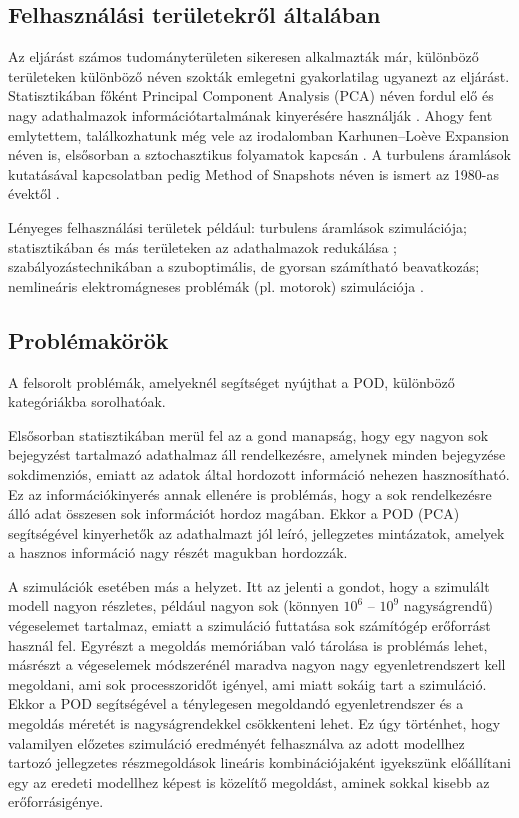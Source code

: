         \subsection{Felhasználási területekről általában}
            Az eljárást számos tudományterületen sikeresen alkalmazták már, különböző területeken különböző néven szokták emlegetni gyakorlatilag ugyanezt az eljárást. Statisztikában főként Principal Component Analysis (PCA) néven fordul elő és nagy adathalmazok információtartalmának kinyerésére használják \cite{Jolliffe16}. Ahogy fent emlytettem, találkozhatunk még vele az irodalomban Karhunen–Lo\`eve Expansion néven is, elsősorban a sztochasztikus folyamatok kapcsán \cite{Aadithya18}. A turbulens áramlások kutatásával kapcsolatban pedig Method of Snapshots néven is ismert az 1980-as évektől \cite{Sirovich}.
            \par
            Lényeges felhasználási területek például: turbulens áramlások szimulációja; statisztikában és más területeken az adathalmazok redukálása \cite{Jolliffe16}; szabályozástechnikában a szuboptimális, de gyorsan számítható beavatkozás; nemlineáris elektromágneses problémák (pl. motorok) szimulációja \cite{Henneron14}.
        \subsection{Problémakörök}
            A felsorolt problémák, amelyeknél segítséget nyújthat a POD, különböző kategóriákba sorolhatóak.
            \par
            Elsősorban statisztikában merül fel az a gond manapság, hogy egy nagyon sok bejegyzést tartalmazó adathalmaz áll rendelkezésre, amelynek minden bejegyzése sokdimenziós, emiatt az adatok által hordozott információ nehezen hasznosítható. Ez az információkinyerés annak ellenére is problémás, hogy a sok rendelkezésre álló adat összesen sok információt hordoz magában. Ekkor a POD (PCA) segítségével kinyerhetők az adathalmazt jól leíró, jellegzetes mintázatok, amelyek a hasznos információ nagy részét magukban hordozzák.
            \par
            A szimulációk esetében más a helyzet. Itt az jelenti a gondot, hogy a szimulált modell nagyon részletes, például nagyon sok (könnyen $10^6$ -- $10^9$ nagyságrendű) végeselemet tartalmaz, emiatt a szimuláció futtatása sok számítógép erőforrást használ fel. Egyrészt a megoldás memóriában való tárolása is problémás lehet, másrészt a végeselemek módszerénél maradva nagyon nagy egyenletrendszert kell megoldani, ami sok processzoridőt igényel, ami miatt sokáig tart a szimuláció. Ekkor a POD segítségével a ténylegesen megoldandó egyenletrendszer és a megoldás méretét is nagyságrendekkel csökkenteni lehet. Ez úgy történhet, hogy valamilyen előzetes szimuláció eredményét felhasználva az adott modellhez tartozó jellegzetes részmegoldások lineáris kombinációjaként igyekszünk előállítani egy az eredeti modellhez képest is közelítő megoldást, aminek sokkal kisebb az erőforrásigénye.
